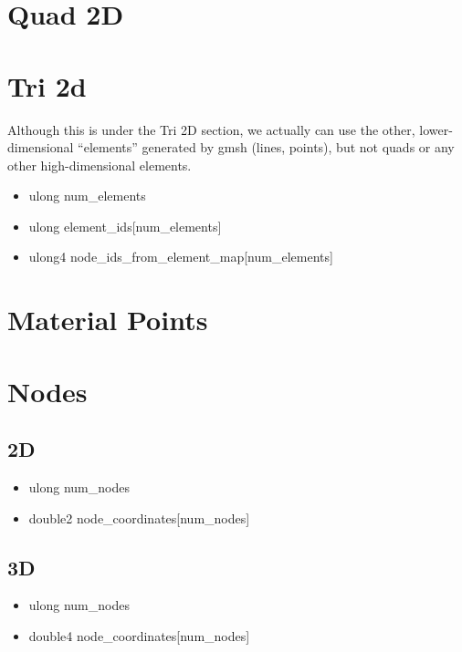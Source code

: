 \documentclass{article}
\begin{document}
%
\section{Quad 2D}

\section{Tri 2d}
Although this is under the Tri 2D section, we actually can use the other, lower-dimensional ``elements'' generated by gmsh (lines, points), but not quads or any other high-dimensional elements.
\begin{itemize}
    \item ulong num\_elements
    \item ulong element\_ids[num\_elements]
    \item ulong4 node\_ids\_from\_element\_map[num\_elements]
\end{itemize}

\section{Material Points}

\section{Nodes}
\subsection{2D}
\begin{itemize}
    \item ulong num\_nodes
    \item double2 node\_coordinates[num\_nodes]
\end{itemize}
\subsection{3D}
\begin{itemize}
    \item ulong num\_nodes
    \item double4 node\_coordinates[num\_nodes]
\end{itemize}
\end{document}
